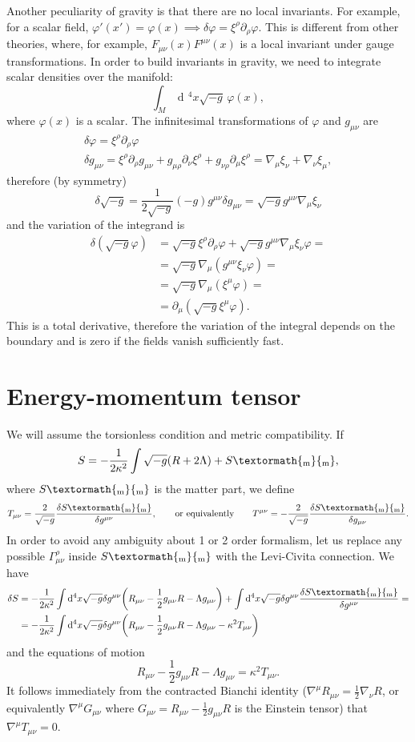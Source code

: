 \documentclass[a4paper,12pt]{book}
\newcommand{\ped}[1]{\textormath{\textsubscript{#1}}{_{\mathrm{#1}}}}
\newcommand{\ap}[1]{\textormath{\textsuperscript{#1}}{^{\mathrm{#1}}}}
\newcommand{\dd}{\mathop{\mathrm{d}\!}{}}
\theoremstyle{definition}
\theoremstyle{remark}
\begin{document}
Another peculiarity of gravity is that there are no local invariants. For example, for a scalar field, $\varphi'(x')=\varphi(x)\implies\delta\varphi=\xi^\rho\partial_\rho\varphi$. This is different from other theories, where, for example, $F_{\mu\nu}(x)F^{\mu\nu}(x)$ is a local invariant under gauge transformations. In order to build invariants in gravity, we need to integrate scalar densities over the manifold:
\[\int_M\dd^4x\sqrt{-g}\,\varphi(x),\]
where $\varphi(x)$ is a scalar. The infinitesimal transformations of $\varphi$ and $g_{\mu\nu}$ are
\begin{gather*}
\delta\varphi=\xi^\rho\partial_\rho\varphi\\
\delta g_{\mu\nu}=\xi^\rho\partial_\rho g_{\mu\nu}+g_{\mu\rho}\partial_\nu\xi^\rho+g_{\nu\rho}\partial_\mu\xi^\rho=\nabla_\mu\xi_\nu+\nabla_\nu\xi_\mu,
\end{gather*}
therefore (by symmetry)
\[\delta\sqrt{-g}=\frac1{2\sqrt{-g}}(-g)g^{\mu\nu}\delta g_{\mu\nu}=\sqrt{-g}g^{\mu\nu}\nabla_\mu\xi_\nu\]
and the variation of the integrand is
\begin{align*}
\delta(\sqrt{-g}\varphi)&=\sqrt{-g}\xi^\rho\partial_\rho\varphi+\sqrt{-g}g^{\mu\nu}\nabla_\mu\xi_\nu\varphi=\\
&=\sqrt{-g}\nabla_\mu(g^{\mu\nu}\xi_\nu\varphi)=\\
&=\sqrt{-g}\nabla_\mu(\xi^\mu\varphi)=\\
&=\partial_\mu(\sqrt{-g}\xi^\mu\varphi).
\end{align*}
This is a total derivative, therefore the variation of the integral depends on the boundary and is zero if the fields vanish sufficiently fast.

\section{Energy-momentum tensor}
We will assume the torsionless condition and metric compatibility. If
\[S=-\frac1{2\kappa^2}\int\sqrt{-g}(R+2\Lambda)+S\ped{m},\]
where $S\ped{m}$ is the matter part, we define
\[T_{\mu\nu}=\frac2{\sqrt{-g}}\frac{\delta S\ped{m}}{\delta g^{\mu\nu}},\qquad\text{or equivalently}\qquad T^{\mu\nu}=-\frac2{\sqrt{-g}}\frac{\delta S\ped{m}}{\delta g_{\mu\nu}}.\]
In order to avoid any ambiguity about 1\ap{st} or 2\ap{nd} order formalism, let us replace any possible $\Gamma^\rho_{\mu\nu}$ inside $S\ped{m}$ with the Levi-Civita connection. We have
\begin{align*}
\delta S&=-\frac1{2\kappa^2}\int\dd^4x\sqrt{-g}\delta g^{\mu\nu}\biggl(R_{\mu\nu}-\frac12g_{\mu\nu}R-\Lambda g_{\mu\nu}\biggr)+\int\dd^4x\sqrt{-g}\delta g^{\mu\nu}\frac{\delta S\ped{m}}{\delta g^{\mu\nu}}=\\
&=-\frac1{2\kappa^2}\int\dd^4x\sqrt{-g}\delta g^{\mu\nu}\biggl(R_{\mu\nu}-\frac12g_{\mu\nu}R-\Lambda g_{\mu\nu}-\kappa^2T_{\mu\nu}\biggr)
\end{align*}
and the equations of motion
\[R_{\mu\nu}-\frac12g_{\mu\nu}R-\Lambda g_{\mu\nu}=\kappa^2T_{\mu\nu}.\]
It follows immediately from the contracted Bianchi identity ($\nabla^\mu R_{\mu\nu}=\frac12\nabla_\nu R$, or equivalently $\nabla^\mu G_{\mu\nu}$ where $G_{\mu\nu}=R_{\mu\nu}-\frac12g_{\mu\nu}R$ is the Einstein tensor) that $\nabla^\mu T_{\mu\nu}=0$.
\end{document}
